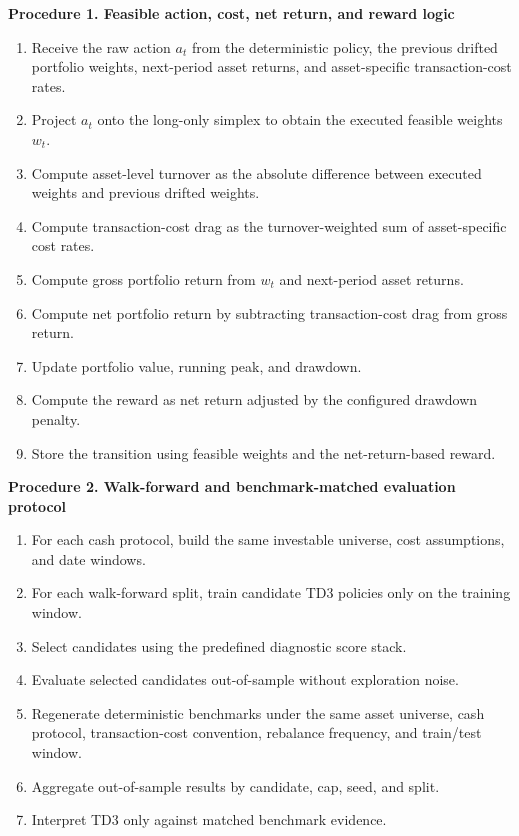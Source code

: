 \documentclass[12pt]{article}
\begin{document}
\textbf{Procedure 1. Feasible action, cost, net return, and reward logic}

\begin{enumerate}[label=\arabic*.,leftmargin=*,itemsep=2pt,parsep=0pt,topsep=4pt]
    \item Receive the raw action $a_t$ from the deterministic policy, the previous drifted portfolio weights, next-period asset returns, and asset-specific transaction-cost rates.
    \item Project $a_t$ onto the long-only simplex to obtain the executed feasible weights $w_t$.
    \item Compute asset-level turnover as the absolute difference between executed weights and previous drifted weights.
    \item Compute transaction-cost drag as the turnover-weighted sum of asset-specific cost rates.
    \item Compute gross portfolio return from $w_t$ and next-period asset returns.
    \item Compute net portfolio return by subtracting transaction-cost drag from gross return.
    \item Update portfolio value, running peak, and drawdown.
    \item Compute the reward as net return adjusted by the configured drawdown penalty.
    \item Store the transition using feasible weights and the net-return-based reward.
\end{enumerate}

\textbf{Procedure 2. Walk-forward and benchmark-matched evaluation protocol}

\begin{enumerate}[label=\arabic*.,leftmargin=*,itemsep=2pt,parsep=0pt,topsep=4pt]
    \item For each cash protocol, build the same investable universe, cost assumptions, and date windows.
    \item For each walk-forward split, train candidate TD3 policies only on the training window.
    \item Select candidates using the predefined diagnostic score stack.
    \item Evaluate selected candidates out-of-sample without exploration noise.
    \item Regenerate deterministic benchmarks under the same asset universe, cash protocol, transaction-cost convention, rebalance frequency, and train/test window.
    \item Aggregate out-of-sample results by candidate, cap, seed, and split.
    \item Interpret TD3 only against matched benchmark evidence.
\end{enumerate}
\end{document}
